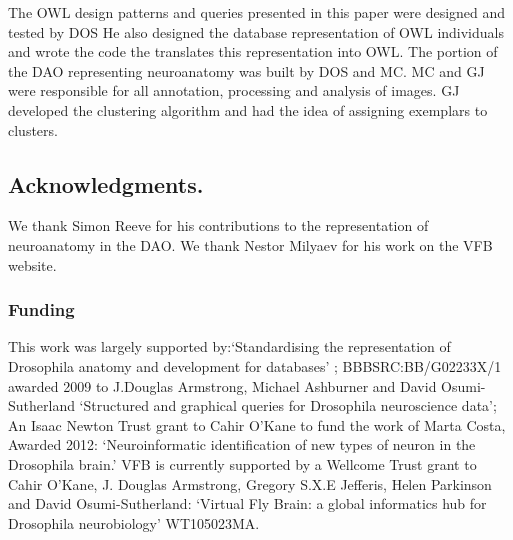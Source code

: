 \documentclass[runningheads,a4paper]{llncs}
\begin{document}
The OWL design patterns and queries presented in this paper were designed and
tested by DOS  He also designed the database representation of OWL
individuals and wrote the code the translates this representation into
OWL.  The portion of the DAO representing neuroanatomy was built by
DOS and MC.  MC and GJ were responsible for all annotation,
processing and analysis of images. GJ developed the clustering
algorithm and had the idea of assigning exemplars to clusters.

\subsection*{Acknowledgments.}

We thank Simon Reeve for his contributions to the representation of
neuroanatomy in the DAO.  We thank Nestor Milyaev for his work on the
VFB website.

\subsubsection*{Funding}

This work was largely supported by:`Standardising the representation of
Drosophila anatomy and development for databases' ;
BBBSRC:BB/G02233X/1 awarded 2009 to J.Douglas Armstrong, Michael
Ashburner and David Osumi-Sutherland `Structured and graphical queries
for Drosophila neuroscience data'; An Isaac Newton Trust grant to
Cahir O'Kane to fund the work of Marta Costa, Awarded 2012:
`Neuroinformatic identification of new types of neuron in the
Drosophila brain.' VFB is currently supported by a Wellcome Trust
grant to Cahir O'Kane, J. Douglas Armstrong, Gregory S.X.E Jefferis,
Helen Parkinson and David Osumi-Sutherland: `Virtual Fly Brain: a
global informatics hub for Drosophila neurobiology' WT105023MA.






\end{document}
